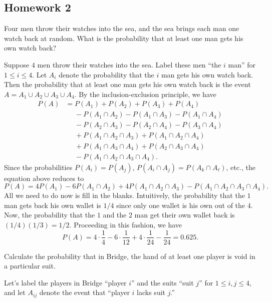 \subsection{Homework 2}
\begin{problem}[Handout 2, \# 5]
  Four men throw their watches into the sea, and the sea brings each man
  one watch back at random. What is the probability that at least one man
  gets his own watch back?
\end{problem}
\begin{solution*}
  Suppose \(4\) men throw their watches into the sea. Label these men ``the
  \(i\) man'' for \(1\leq i\leq 4\). Let \(A_i\) denote the
  probability that the \(i\) man gets his own watch back. Then
  the probability that at least one man gets his own watch back is the
  event \(A=A_1\cup A_2\cup A_3\cup A_4\). By the inclusion-exclusion
  principle, we have
  \[
    \begin{aligned}
      P(
      A)&=P(A_1)+P(A_2)+P(A_3)+P(A_4)\\
      &\phantom{{}={}}-P(A_1\cap A_2)-P(A_1\cap A_3)-P(A_1\cap A_4)\\
      &\phantom{{}={}}-P(A_2\cap A_3)-P(A_2\cap A_4)-P(A_3\cap A_4)\\
      &\phantom{{}={}}+P(A_1\cap A_2\cap A_3)+P(A_1\cap A_2\cap A_4)\\
      &\phantom{{}={}}+P(A_1\cap A_3\cap A_4)+P(A_2\cap A_3\cap A_4)\\
      &\phantom{{}={}}-P(A_1\cap A_2\cap A_3\cap A_4).
    \end{aligned}
  \]
  Since the probabilities \(P(A_i)=P(A_j)\), \(P(A_i\cap A_j)=P(A_k\cap
  A_\ell)\), etc., the equation above reduces to
  \[
    P(A)=4P(A_1)-6P(A_1\cap A_2)+4P(A_1\cap A_2\cap A_3)-P(A_1\cap A_2\cap
    A_3\cap A_4).
  \]
  All we need to do now is fill in the blanks. Intuitively, the probability
  that the \(1\) man gets back his own wallet is \(1/4\) since
  only one wallet is his own out of the \(4\). Now, the probability that
  the \(1\) and the \(2\) man get their own wallet
  back is \((1/4)(1/3)=1/2\). Proceeding in this fashion, we have
  \[
    P(A)=4\cdot\frac{1}{4}-6\cdot\frac{1}{12}+4\cdot\frac{1}{24}-\frac{1}{24}
    =0.625.
  \]
\end{solution*}

\begin{problem}[Handout 2, \# 7]
  Calculate the probability that in Bridge, the hand of at least one player
  is void in a particular suit.
\end{problem}
\begin{solution*}
  Let's label the players in Bridge ``player \(i\)'' and the suits ``suit
  \(j\)'' for \(1\leq i,j\leq 4\), and let \(A_{ij}\) denote the event that
  ``player \(i\) lacks suit \(j\).''
\end{solution*}

